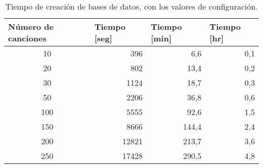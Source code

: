 \begin{table}[]
\centering
\caption{Tiempo de creación de bases de datos, con los valores de configuración.}
\label{tab:TiemposNuevaConfiguracion}
\begin{tabular}{@{}crrr@{}}
\toprule
\midrule
\multicolumn{1}{l}{Número de canciones} & \multicolumn{1}{l}{Tiempo {[}seg{]}} & \multicolumn{1}{l}{Tiempo {[}min{]}} & \multicolumn{1}{l}{Tiempo {[}hr{]}} \\ \midrule
10                                      & 396                                & 6,6                                  & 0,1                                 \\
20                                      & 802                                & 13,4                                 & 0,2                                 \\
30                                      & 1124                               & 18,7                                 & 0,3                                 \\
50                                      & 2206                               & 36,8                                 & 0,6                                 \\
100                                     & 5555                               & 92,6                                 & 1,5                                 \\
150                                     & 8666                               & 144,4                                & 2,4                                 \\
200                                     & 12821                              & 213,7                                & 3,6                                 \\
250                                     & 17428                              & 290,5                                & 4,8                                 \\
\midrule \bottomrule
\end{tabular}
\end{table}


